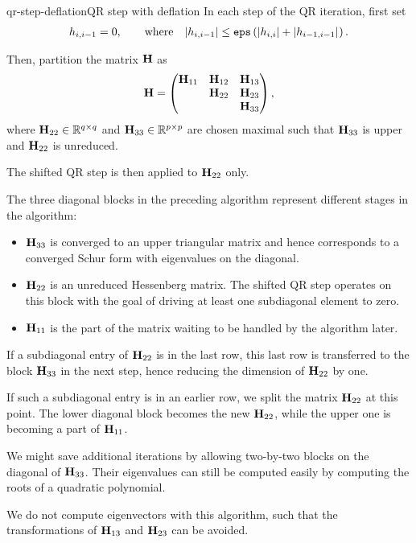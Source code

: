 \begin{Algorithm*}{qr-step-deflation}{QR step with deflation}
  In each step of the QR iteration, first set
  \begin{gather}
    h_{i,i-1} = 0, \qquad \text{where}\quad
    \lvert h_{i,i-1}\rvert \le \texttt{eps} \left(\lvert h_{i,i}\rvert+\lvert h_{i-1,i-1}\rvert_{\vphantom{g}}\right).
  \end{gather}

  Then, partition the matrix
  $\mathbf H$ as
  \begin{gather}
    \mathbf H =
    \begin{pmatrix}
      \mathbf H_{11} & \mathbf H_{12} & \mathbf H_{13} \\
      & \mathbf H_{22} & \mathbf H_{23}\\
      && \mathbf H_{33}
    \end{pmatrix},
  \end{gather}
  where $\mathbf H_{22}\in\mathbb R^{q\times q}$ and
  $\mathbf H_{33}\in\mathbb R^{p\times p}$ are chosen maximal such that
  $\mathbf H_{33}$ is upper  and $\mathbf H_{22}$
  is unreduced.

  The shifted QR step is then applied to $\mathbf H_{22}$ only.
\end{Algorithm*}

\begin{remark}
  The three diagonal blocks in the preceding algorithm represent different stages in the algorithm:
  \begin{itemize}
  \item $\mathbf H_{33}$ is converged to an upper triangular matrix and
    hence corresponds to a converged Schur form with eigenvalues on
    the diagonal.
  \item $\mathbf H_{22}$ is an unreduced Hessenberg matrix. The shifted QR
    step operates on this block with the goal of driving at least one
    subdiagonal element to zero.
  \item $\mathbf H_{11}$ is the part of the matrix waiting to be handled
    by the algorithm later.
  \end{itemize}
  If a subdiagonal entry of $\mathbf H_{22}$ is in the last row, this last
  row is transferred to the block $\mathbf H_{33}$ in the next step, hence
  reducing the dimension of $\mathbf H_{22}$ by one.

  If such a subdiagonal entry is in an earlier row, we split the
  matrix $\mathbf H_{22}$ at this point. The lower diagonal block becomes
  the new $\mathbf H_{22}$, while the upper one is becoming a part of
  $\mathbf H_{11}$.

  We might save additional iterations by allowing two-by-two blocks on
  the diagonal of $\mathbf H_{33}$. Their eigenvalues can still be
  computed easily by computing the roots of a quadratic polynomial.
  
  We do not compute eigenvectors with this algorithm, such that the
  transformations of $\mathbf H_{13}$ and $\mathbf H_{23}$ can be avoided.
\end{remark}

